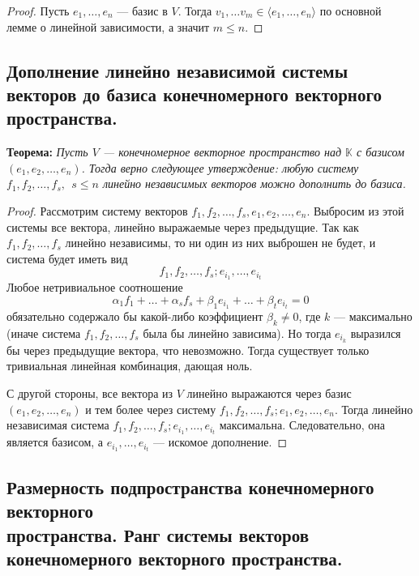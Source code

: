\documentclass[a4paper, 12pt]{article}
\begin{document}
\begin{proof}
Пусть $e_1, \dots, e_n$ — базис в $V$. Тогда $v_1, \dots v_m \in \langle e_1, \dots, e_n\rangle$ по основной лемме о линейной зависимости, а значит $m \leqslant n$.
\end{proof}

\subsection{Дополнение линейно независимой системы векторов до базиса конечномерного векторного пространства.}
\textbf{Теорема:} \textit{Пусть $V$ --- конечномерное векторное пространство над $\mathbb{K}$ с базисом\\ $(e_1, e_2, \ldots, e_n)$. Тогда верно следующее утверждение: любую систему $f_1, f_2, \ldots, f_s,\ \  s \leqslant n$ линейно независимых векторов можно дополнить до базиса.}
\begin{proof}
Рассмотрим систему векторов $f_1, f_2, \ldots, f_s, e_1, e_2, \ldots, e_n$. Выбросим из этой системы все вектора, линейно выражаемые через предыдущие. Так как $f_1, f_2, \ldots, f_s$ линейно независимы, то ни один из них выброшен не будет, и система будет иметь вид
\[f_1, f_2, \ldots, f_s; e_{i_1}, \ldots, e_{i_t}\]
Любое нетривиальное соотношение
\[\alpha_1 f_1 + \ldots + \alpha_s f_s + \beta_1 e_{i_1} + \ldots + \beta_t e_{i_t} = 0\]
обязательно содержало бы какой-либо коэффициент $\beta_{k} \neq 0$, где $k$ --- максимально (иначе система $f_1, f_2, \ldots, f_s$ была бы линейно зависима). Но тогда $e_{i_k}$ выразился бы через предыдущие вектора, что невозможно. Тогда существует только тривиальная линейная комбинация, дающая ноль.

С другой стороны, все вектора из $V$ линейно выражаются через базис $(e_1, e_2, \ldots, e_n)$ и тем более через систему $f_1, f_2, \ldots, f_s; e_1, e_2, \ldots, e_n$. Тогда линейно независимая система $f_1, f_2, \ldots, f_s; e_{i_1}, \ldots, e_{i_t}$ максимальна. Следовательно, она является базисом, а $e_{i_1}, \ldots, e_{i_t}$ --- искомое дополнение.
\end{proof}

\subsection{Размерность подпространства конечномерного векторного\\ пространства. Ранг системы векторов конечномерного векторного пространства.}
\end{document}

